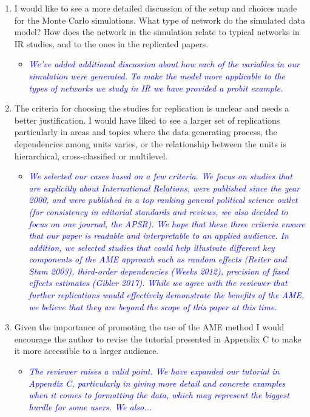 \begin{enumerate}
\begin{itemize}
{{				}}
	\end{itemize}
	\item I would like to see a more detailed discussion of the setup and choices made for the Monte Carlo simulations. What type of network do the simulated data model? How does the network in the simulation relate to typical networks in IR studies, and to the ones in the replicated papers.
	\begin{itemize}
		\item \textcolor{blue}{ \emph{
		We've added additional discussion about how each of the variables in our simulation were generated. To make the model more applicable to the types of networks we study in IR we have provided a probit example.
		}}
	\end{itemize}
	\item The criteria for choosing the studies for replication is unclear and needs a better justification. I would have liked to see a larger set of replications particularly in areas and topics where the data generating process, the dependencies among units varies, or the relationship between the units is hierarchical, cross-classified or multilevel.
	\begin{itemize}
		\item \textcolor{blue}{ \emph{
		We selected our cases based on a few criteria. We focus on studies that are explicitly about International Relations, were published since the year 2000, and were published in a top ranking general political science outlet (for consistency in editorial standards and reviews, we also decided to focus on one journal, the APSR). We hope that these three criteria ensure that our paper is readable and interpretable to an applied audience. In addition, we selected studies that could help illustrate different key components of the AME approach such as random effects (Reiter and Stam 2003), third-order dependencies (Weeks 2012), precision of fixed effects estimates (Gibler 2017).  While we agree with the reviewer that further replications would effectively demonstrate the benefits of the AME, we believe that they are beyond the scope of this paper at this time.
		}}
	\end{itemize}
	\item Given the importance of promoting the use of the AME method I would encourage the author to revise the tutorial presented in Appendix C to make it more accessible to a larger audience.
	\begin{itemize}
		\item \textcolor{blue}{ \emph{
		The reviewer raises a valid point. We have expanded our tutorial in Appendix C, particularly in giving more detail and concrete examples when it comes to formatting the data, which may represent the biggest hurdle for some users. We also...
		}}
	\end{itemize}
\end{enumerate}
